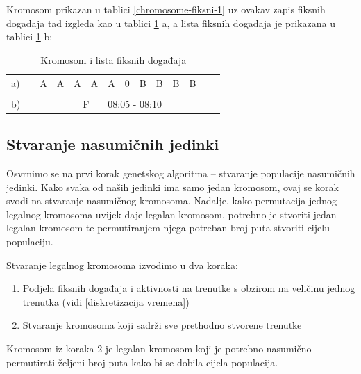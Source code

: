 \documentclass[times, utf8, zavrsni]{fer}
\begin{document}
Kromosom prikazan u tablici \ref{chromosome-fiksni-1} uz ovakav zapis fiksnih događaja tad izgleda kao u tablici \ref{chromosome-fiksni-3} a, a lista fiksnih događaja je prikazana u tablici \ref{chromosome-fiksni-3} b:

\begin{table}[!htbp]
\centering
\caption{Kromosom i lista fiksnih događaja}
\label{chromosome-fiksni-3}
\begin{tabular}{llclclllllllll}
\cline{3-12}
a) & \multicolumn{1}{l|}{} & \multicolumn{1}{c|}{A} & \multicolumn{1}{c|}{A} & \multicolumn{1}{c|}{A} & \multicolumn{1}{c|}{A} & \multicolumn{1}{c|}{A} & \multicolumn{1}{c|}{0} & \multicolumn{1}{c|}{B} & \multicolumn{1}{c|}{B} & \multicolumn{1}{c|}{B} & \multicolumn{1}{c|}{B} &  &  \\ \cline{3-12}
   &                       & \multicolumn{1}{l}{}   &                        & \multicolumn{1}{l}{}   &                        &                        &                        &                        &                        &                        &                        &  &  \\ \cline{5-10}
b) &                       &                        & \multicolumn{1}{l|}{}  & \multicolumn{2}{c|}{F}                          & \multicolumn{4}{l|}{08:05 - 08:10}                                                                &                        &                        &  &  \\ \cline{5-10}
\end{tabular}
\end{table}

\subsection{Stvaranje nasumičnih jedinki}
Osvrnimo se na prvi korak genetskog algoritma -- stvaranje populacije nasumičnih jedinki. Kako svaka od naših jedinki ima samo jedan kromosom, ovaj se korak svodi na stvaranje nasumičnog kromosoma. Nadalje, kako permutacija jednog legalnog kromosoma uvijek daje legalan kromosom, potrebno je stvoriti jedan legalan kromosom te permutiranjem njega potreban broj puta stvoriti cijelu populaciju.

Stvaranje legalnog kromosoma izvodimo u dva koraka:
\begin{enumerate}
	\item Podjela fiksnih događaja i aktivnosti na trenutke s obzirom na veličinu jednog trenutka (vidi \ref{diskretizacija vremena})
	\item Stvaranje kromosoma koji sadrži sve prethodno stvorene trenutke
\end{enumerate}
Kromosom iz koraka 2 je legalan kromosom koji je potrebno nasumično permutirati željeni broj puta kako bi se dobila cijela populacija.
\end{document}

